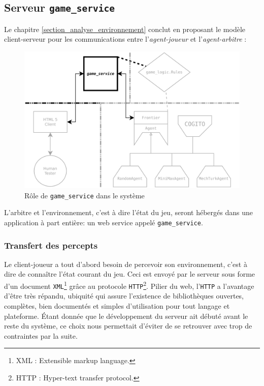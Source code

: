 \subsection{Serveur \texttt{game\_service}}
Le chapitre \ref{section_analyse_environnement} conclut en proposant le modèle client-serveur pour les communications entre l'\emph{agent-joueur} et l'\emph{agent-arbitre} :

\begin{figure}[H] 
\centering
\includegraphics[width=\textwidth]{files/william/archi_serveur} 
\caption{Rôle de \texttt{game\_service} dans le système} 
\end{figure}

L'arbitre et l'environnement, c'est à dire l'état du jeu, seront hébergés dans une application à part entière: un \og web service \fg{} appelé \texttt{game\_service}.
\subsubsection{Transfert des percepts}
Le client-joueur a tout d'abord besoin de percevoir son environnement, c'est à dire de connaître l'état courant du jeu. Ceci est envoyé par le serveur sous forme d'un  document \texttt{XML}\footnote{ XML : Extensible markup language. } grâce au protocole \texttt{HTTP}\footnote{ HTTP : Hyper-text transfer  protocol. }. Pilier du web, l'\texttt{HTTP} a l'avantage d'être très  répandu, ubiquité qui assure l'existence de bibliothèques ouvertes,  complètes, bien documentés et simples d'utilisation pour tout langage et  plateforme. Étant donnée que le développement du serveur ait débuté avant le reste du système, ce choix nous permettait d'éviter de se retrouver avec trop  de contraintes par la suite.
